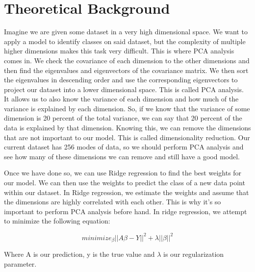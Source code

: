 \documentclass[11pt]{amsart}
\begin{document}
\section{Theoretical Background}\label{sec:theory}
Imagine we are given some dataset in a very high dimensional space. We want to apply a model to identify classes on said dataset, 
but the complexity of multiple higher dimensions makes this task very difficult. This is where PCA analysis comes in. We check the covariance 
of each dimension to the other dimensions and then find the eigenvalues and eigenvectors of the covariance matrix. We then sort the eigenvalues in 
descending order and use the corresponding eigenvectors to project our dataset into a lower dimensional space. This is called PCA analysis. It allows us 
to also know the variance of each dimension and how much of the variance is explained by each dimension. So, if we know that the variance 
of some dimension is 20 percent of the total variance, we can say that 20 percent of the data is explained by that dimension. Knowing this, we can remove 
the dimensions that are not important to our model. This is called dimensionality reduction. Our current dataset has 
256 modes of data, so we should perform PCA analysis and see how many of these dimensions we can remove and still have a good model.

Once we have done so, we can use Ridge regression to find the best weights for our model. We can then use the weights to predict the class of a new
data point within our dataset. In Ridge regression, we estimate the weights and assume that the dimensions are highly correlated with each other. This is 
why it's so important to perform PCA analysis before hand. In ridge regression, we attempt to minimize the following equation:

\[minimize_\beta ||A\beta - Y||^2 + \lambda||\beta||^2\]

Where A is our prediction, y is the true value and $\lambda$ is our regularization parameter. 
\end{document}
